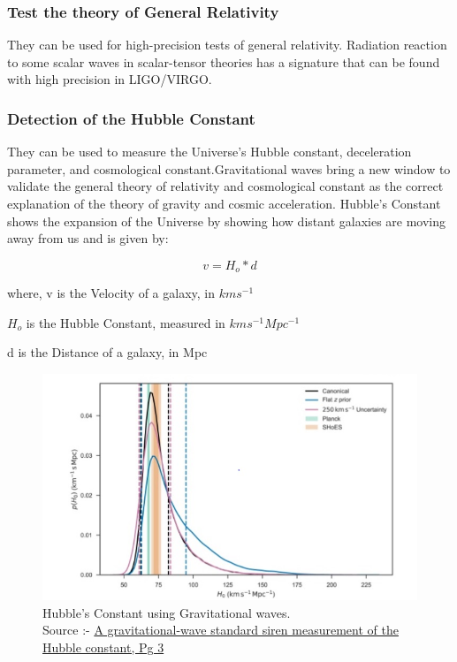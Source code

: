 \subsubsection*{Test the theory of General Relativity}
\hspace{1cm}They can be used for high-precision tests of general relativity. Radiation reaction to some scalar waves in scalar-tensor theories has a signature that can be found with high precision in LIGO/VIRGO.

\subsubsection*{Detection of the Hubble Constant}
\hspace{1cm}They can be used to measure the Universe’s Hubble constant, deceleration parameter, and cosmological constant.Gravitational waves bring a new window to validate the general theory of relativity and cosmological constant as the correct explanation of the theory of gravity and cosmic acceleration. Hubble's Constant shows the expansion of the Universe by showing how distant galaxies are moving away from us and is given by:
 
\begin{equation}
v = H_o*d
\end{equation}

where, v is the Velocity of a galaxy, in $kms^{-1}$

      $H_{o}$ is the Hubble Constant, measured in $kms^{-1}Mpc^{-1}$
      
      d is the Distance of a galaxy, in Mpc

\vspace{1cm}

\begin{figure}
    \centering
    \includegraphics[scale=0.9]{images.tex/HCGW.jpg}
    \caption{Hubble's Constant using Gravitational waves.\\
    Source :- \href{https://www.researchgate.net/profile/Michael-Ross-9/publication/324600496}{A gravitational-wave standard siren measurement of the Hubble constant, Pg 3}}
\end{figure}

